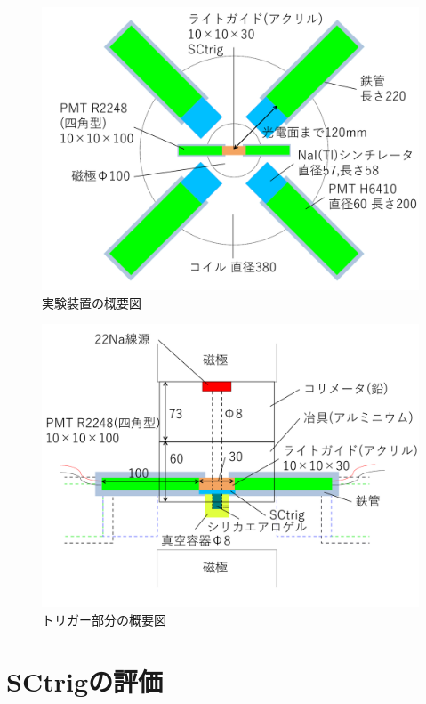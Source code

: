\begin{figure}[H]
\centering
\includegraphics[keepaspectratio,scale=0.4]{fig/ybm/device2.pdf}
\caption{実験装置の概要図}
\label{fig:device2}
\end{figure}

\begin{figure}[H]
\centering
\includegraphics[keepaspectratio,scale=0.4]{fig/ybm/device3.pdf}
\caption{トリガー部分の概要図}
\label{fig:device3}
\end{figure}



\section{SCtrigの評価}

